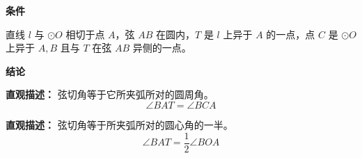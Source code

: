 \begin{statementbox}
	\textbf{\textcolor{CStatement}{条件}}
	\begin{description}[style=nextline, leftmargin=2.8em, labelsep=0.5em, itemsep=0.35em]
		\item[\textbf{\textcolor{CStatement}{条件1（相切于端点）：}}] 直线 $l$ 与 $\odot O$ 相切于点 $A$，弦 $AB$ 在圆内，$T$ 是 $l$ 上异于 $A$ 的一点，点 $C$ 是 $\odot O$ 上异于 $A,B$ 且与 $T$ 在弦 $AB$ 异侧的一点。
	\end{description}

	\textbf{\textcolor{CStatement}{结论}}
	\begin{description}[style=nextline, leftmargin=2.8em, labelsep=0.5em, itemsep=0.45em]
		\item[\textbf{\textcolor{CStatement}{结论一（弦切角等于圆周角）：}}]
			\textbf{\textcolor{CStatement}{直观描述：}}
			弦切角等于它所夹弧所对的圆周角。
			\[
				\angle BAT = \angle BCA
			\]
			\vspace{0.2em}

		\item[\textbf{\textcolor{CStatement}{推广结论（圆心角形式）：}}]
			\textbf{\textcolor{CStatement}{直观描述：}}
			弦切角等于所夹弧所对的圆心角的一半。
			\[
				\angle BAT = \frac{1}{2} \angle BOA
			\]
	\end{description}
\end{statementbox}
